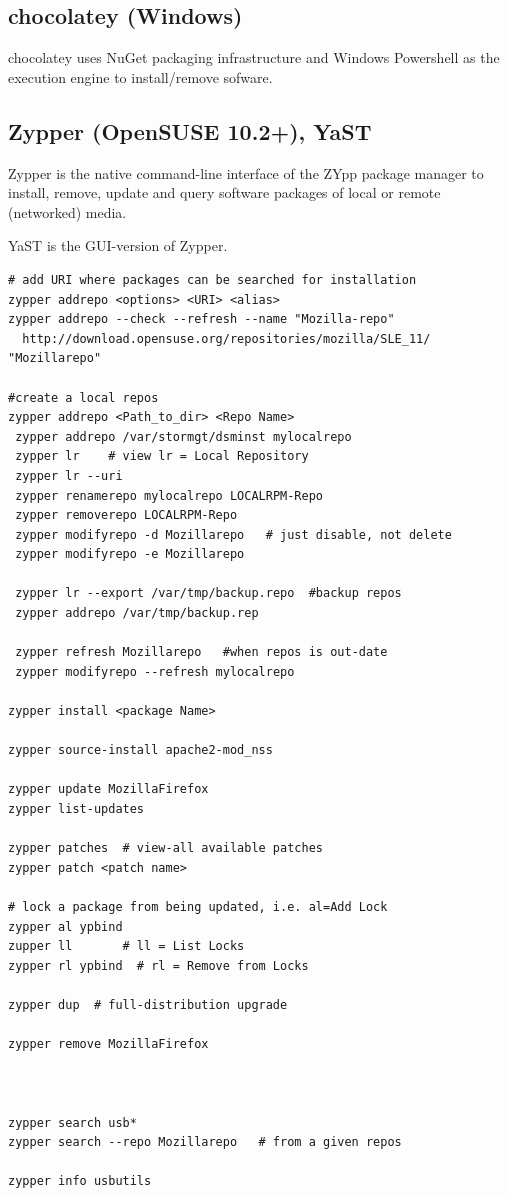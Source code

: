 \subsection{chocolatey (Windows)}
\label{sec:chocolatey}

chocolatey uses NuGet packaging infrastructure and Windows Powershell as the
execution engine to install/remove sofware.

\subsection{Zypper (OpenSUSE 10.2+), YaST}
\label{sec:Zypper}

Zypper is the native command-line interface of the ZYpp package manager to
install, remove, update and query software packages of local or remote (networked) media. 

YaST is the GUI-version of Zypper.

\begin{verbatim}
# add URI where packages can be searched for installation
zypper addrepo <options> <URI> <alias>
zypper addrepo --check --refresh --name "Mozilla-repo"
  http://download.opensuse.org/repositories/mozilla/SLE_11/ "Mozillarepo"

#create a local repos
zypper addrepo <Path_to_dir> <Repo Name>
 zypper addrepo /var/stormgt/dsminst mylocalrepo
 zypper lr    # view lr = Local Repository
 zypper lr --uri
 zypper renamerepo mylocalrepo LOCALRPM-Repo
 zypper removerepo LOCALRPM-Repo
 zypper modifyrepo -d Mozillarepo   # just disable, not delete
 zypper modifyrepo -e Mozillarepo
 
 zypper lr --export /var/tmp/backup.repo  #backup repos
 zypper addrepo /var/tmp/backup.rep  
 
 zypper refresh Mozillarepo   #when repos is out-date
 zypper modifyrepo --refresh mylocalrepo
 
zypper install <package Name>

zypper source-install apache2-mod_nss

zypper update MozillaFirefox
zypper list-updates

zypper patches  # view-all available patches
zypper patch <patch name>

# lock a package from being updated, i.e. al=Add Lock
zypper al ypbind
zupper ll       # ll = List Locks
zypper rl ypbind  # rl = Remove from Locks

zypper dup  # full-distribution upgrade

zypper remove MozillaFirefox



zypper search usb*
zypper search --repo Mozillarepo   # from a given repos

zypper info usbutils

\end{verbatim}

